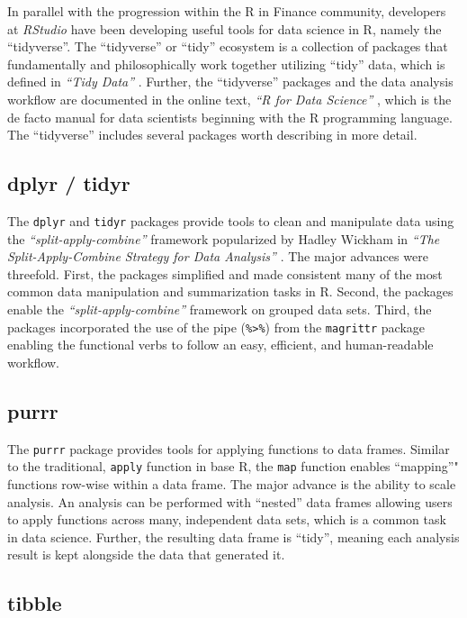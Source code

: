 In parallel with the progression within the R in Finance community,
developers at \emph{RStudio} have been developing useful tools for data
science in R, namely the ``tidyverse''. The ``tidyverse'' or ``tidy''
ecosystem is a collection of packages that fundamentally and
philosophically work together utilizing ``tidy'' data, which is defined
in \emph{``Tidy Data''} \citep{tidy-data}. Further, the ``tidyverse''
packages and the data analysis workflow are documented in the online
text, \emph{``R for Data Science''} \citep{R4DS2017}, which is the de
facto manual for data scientists beginning with the R programming
language. The ``tidyverse'' includes several packages worth describing
in more detail.

\subsection{dplyr / tidyr}\label{dplyr-tidyr}

The \texttt{dplyr} and \texttt{tidyr} packages provide tools to clean
and manipulate data using the \emph{``split-apply-combine''} framework
popularized by Hadley Wickham in \emph{``The Split-Apply-Combine
Strategy for Data Analysis''} \citep{plyr}. The major advances were
threefold. First, the packages simplified and made consistent many of
the most common data manipulation and summarization tasks in R. Second,
the packages enable the \emph{``split-apply-combine''} framework on
grouped data sets. Third, the packages incorporated the use of the pipe
(\texttt{\%\textgreater{}\%}) from the \texttt{magrittr} package
enabling the functional verbs to follow an easy, efficient, and
human-readable workflow.

\subsection{purrr}\label{purrr}

The \texttt{purrr} package provides tools for applying functions to data
frames. Similar to the traditional, \texttt{apply} function in base R,
the \texttt{map} function enables ``mapping''" functions row-wise within
a data frame. The major advance is the ability to scale analysis. An
analysis can be performed with ``nested'' data frames allowing users to
apply functions across many, independent data sets, which is a common
task in data science. Further, the resulting data frame is ``tidy'',
meaning each analysis result is kept alongside the data that generated
it.

\subsection{tibble}\label{tibble}

